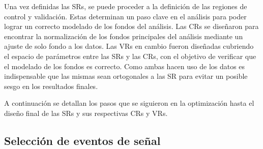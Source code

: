 Una vez definidas las SRs, se puede proceder a la definición de las regiones de control y validación. Estas determinan un paso clave en el análisis para poder lograr un correcto modelado de los fondos del análisis. Las CRs se diseñaron para encontrar la normalización de los fondos principales del análisis mediante un ajuste de solo fondo a los datos. Las VRs en cambio fueron diseñadas cubriendo el espacio de parámetros entre las SRs y las CRs, con el objetivo de verificar que el modelado de los fondos es correcto. Como ambas hacen uso de los datos es indispensable que las mismas sean ortogonales a las SR para evitar un posible sesgo en los resultados finales.

A continuación se detallan los pasos que se siguieron en la optimización hasta el diseño final de las SRs y sus respectivas CRs y VRs.

\subsection{Selección de eventos de señal}

